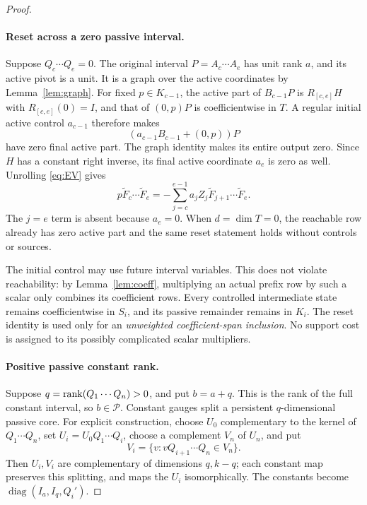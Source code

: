 \begin{proof}
\paragraph{Reset across a zero passive interval.}
Suppose $Q_c\cdots Q_e=0$. The original interval
$P=A_c\cdots A_e$ has unit rank $a$, and its active pivot is a unit.
It is a graph over the active coordinates by Lemma~\ref{lem:graph}.
For fixed $p\in K_{c-1}$, the active part of $B_{c-1}P$ is
$R_{[c,e]}H$ with $R_{[c,e]}(0)=I$, and that of $(0,p)P$ is
coefficientwise in $T$. A regular initial active control $a_{c-1}$
therefore makes
\[
 (a_{c-1}B_{c-1}+(0,p))P
\]
have zero final active part. The graph identity makes its entire
output zero. Since $H$ has a constant right inverse, its final active
coordinate $a_e$ is zero as well. Unrolling \eqref{eq:EV} gives
\begin{equation}\label{eq:reset}
 p\widetilde F_c\cdots\widetilde F_e
 =-\sum_{j=c}^{e-1}a_jZ_j\widetilde F_{j+1}\cdots\widetilde F_e.
\end{equation}
The $j=e$ term is absent because $a_e=0$.
When $d=\dim T=0$, the reachable row already has zero active part
and the same reset statement holds without controls or sources.

The initial control may use future interval variables. This does not
violate reachability: by Lemma~\ref{lem:coeff}, multiplying an actual
prefix row by such a scalar only combines its coefficient rows.
Every controlled intermediate state remains coefficientwise in $S_i$,
and its passive remainder remains in $K_i$. The reset identity is used
only for an \emph{unweighted coefficient-span inclusion}. No support
cost is assigned to its possibly complicated scalar multipliers.

\paragraph{Positive passive constant rank.}
Suppose $q=\operatorname{rank}(Q_1\cdots Q_n)>0$, and put $b=a+q$.
This is the rank of the full constant interval, so $b\in\mathcal P$.
Constant gauges split a persistent $q$-dimensional passive core.
For explicit construction, choose $U_0$ complementary to the kernel
of $Q_1\cdots Q_n$, set $U_i=U_0Q_1\cdots Q_i$, choose a
complement $V_n$ of $U_n$, and put
\[
 V_i=\{v:vQ_{i+1}\cdots Q_n\in V_n\}.
\]
Then $U_i,V_i$ are complementary of dimensions $q,k-q$; each constant
map preserves this splitting, and maps the $U_i$ isomorphically.
The constants become $\operatorname{diag}(I_a,I_q,Q_i')$.


\end{proof}
